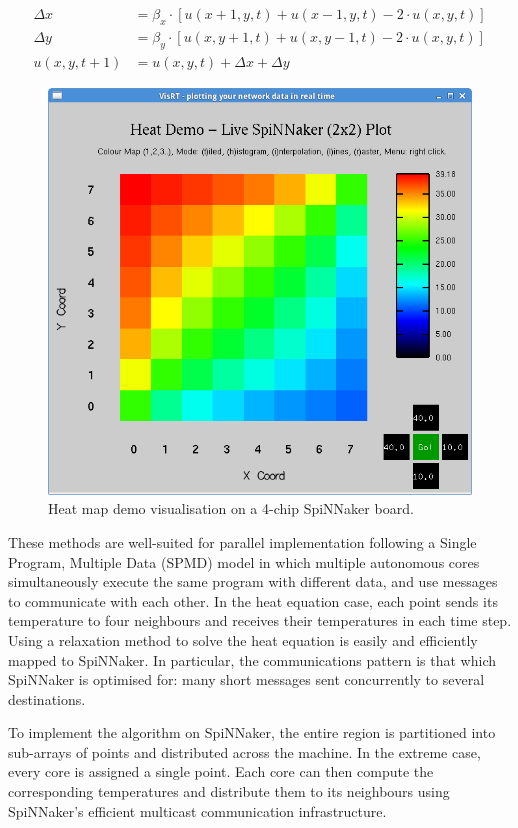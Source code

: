 \documentclass[oneside, a4paper, 11pt]{memoir}
\begin{document}
\begin{align*}
\Delta x   &= \beta_x \cdot [u(x+1,y,t) + u(x-1,y,t) - 2 \cdot u(x,y,t)] \\
\Delta y   &= \beta_y \cdot [u(x,y+1,t) + u(x,y-1,t) - 2 \cdot u(x,y,t)] \\
u(x,y,t+1) &= u(x,y,t) + \Delta x + \Delta y
\end{align*}


\begin{figure}[t]
	\centering
	\includegraphics[width=0.6\linewidth]{images/heatmap2x2.png}
	\caption{Heat map demo visualisation on a 4-chip SpiNNaker board.}
	\label{fig:heatmap}
\end{figure}

These methods are well-suited for parallel implementation following a Single Program, Multiple Data (SPMD) model in which multiple autonomous cores simultaneously execute the same program with different data, and use messages to communicate with each other. In the heat equation case, each point sends its temperature to four neighbours and receives their temperatures in each time step. Using a relaxation method to solve the heat equation is easily and efficiently mapped to SpiNNaker. In particular, the communications pattern is that which SpiNNaker is optimised for: many short messages sent concurrently to several destinations.

To implement the algorithm on SpiNNaker, the entire region is partitioned into sub-arrays of points and distributed across the machine. In the extreme case, every core is assigned a single point. Each core can then compute the corresponding temperatures and distribute them to its neighbours using SpiNNaker's efficient multicast communication infrastructure.
\end{document}
